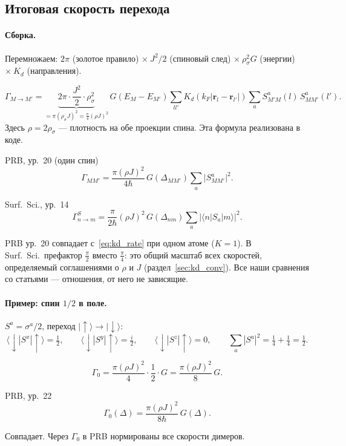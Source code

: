 \subsection{Итоговая скорость перехода}
\label{sec:kd_rate}

\paragraph{Сборка.} Перемножаем: $2\pi$ (золотое правило) $\times\ J^2/2$ (спиновый
след) $\times\ \rho_\sigma^2G$ (энергии) $\times\ K_d$ (направления).
\begin{resbox}
\begin{equation}
\Gamma_{M\to M'}=\underbrace{2\pi\cdot\frac{J^2}{2}\cdot\rho_\sigma^2}_{=\pi(\rho_\sigma J)^2=\frac\pi4(\rho J)^2}
\,G(E_M-E_{M'})\sum_{ll'}K_d(k_F|\mathbf r_l-\mathbf r_{l'}|)\sum_a
S^a_{M'M}(l)\,S^a_{MM'}(l') .
\label{eq:kd_rate}
\end{equation}
Здесь $\rho=2\rho_\sigma$ --- плотность на обе проекции спина. Эта формула
реализована в коде.
\end{resbox}
\begin{paperbox}{PRB, ур.~20 (один спин)}
\[
\Gamma_{MM'}=\frac{\pi(\rho J)^2}{4\hbar}\,G(\Delta_{MM'})\sum_a\big|S^a_{MM'}\big|^2 .
\]
\end{paperbox}
\begin{paperbox}{Surf.\ Sci., ур.~14}
\[
\Gamma^S_{n\to m}=\frac{\pi}{2\hbar}(\rho J)^2\,G(\Delta_{nm})\sum_a|\langle n|S_a|m\rangle|^2 .
\]
\end{paperbox}
\begin{cmpbox}
PRB ур.~20 совпадает с~\eqref{eq:kd_rate} при одном атоме ($K=1$). В Surf.\ Sci.\
префактор $\tfrac\pi2$ вместо $\tfrac\pi4$: это общий масштаб всех скоростей,
определяемый соглашениями о $\rho$ и $J$ (раздел~\ref{sec:kd_conv}). Все наши
сравнения со статьями --- отношения, от него не зависящие.
\end{cmpbox}

\paragraph{Пример: спин $1/2$ в поле.} $S^a=\sigma^a/2$, переход
$|\!\uparrow\rangle\to|\!\downarrow\rangle$:
\[
\langle\downarrow|S^x|\uparrow\rangle=\tfrac12,\qquad
\langle\downarrow|S^y|\uparrow\rangle=\tfrac i2,\qquad
\langle\downarrow|S^z|\uparrow\rangle=0,\qquad
\sum_a|S^a|^2=\tfrac14+\tfrac14=\tfrac12 .
\]
\begin{resbox}
\[
\Gamma_0=\frac{\pi(\rho J)^2}{4}\cdot\frac12\cdot G=\frac{\pi(\rho J)^2}{8}\,G .
\]
\end{resbox}
\begin{paperbox}{PRB, ур.~22}
\[
\Gamma_0(\Delta)=\frac{\pi(\rho J)^2}{8\hbar}\,G(\Delta).
\]
\end{paperbox}
\begin{cmpbox}
Совпадает. Через $\Gamma_0$ в PRB нормированы все скорости димеров.
\end{cmpbox}

